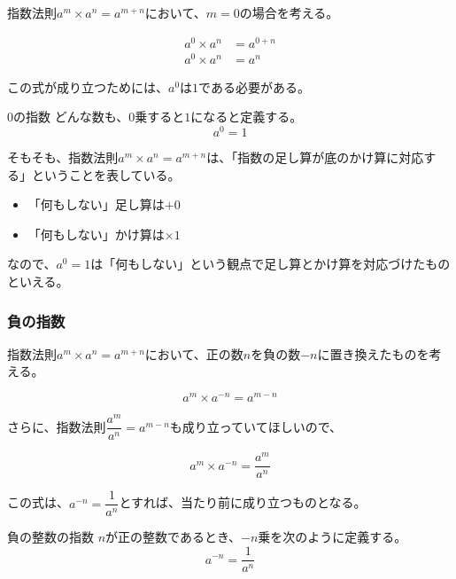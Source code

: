 \documentclass[16pt,b5paper]{book}
\begin{document}
指数法則$a^m \times a^n = a^{m+n}$において、$m=0$の場合を考える。

\begin{align}
  a^0 \times a^n & = a^{0+n} \\
  a^0 \times a^n & = a^n
\end{align}

この式が成り立つためには、$a^0$は$1$である必要がある。

\begin{definition}{$0$の指数}
  \newline
  どんな数も、$0$乗すると$1$になると定義する。
  \LARGE
  \begin{equation}
    a^0 = 1
  \end{equation}
\end{definition}

そもそも、指数法則$a^m \times a^n = a^{m+n}$は、「指数の足し算が底のかけ算に対応する」ということを表している。

\begin{itemize}
  \item 「何もしない」足し算は$+ 0$
  \item 「何もしない」かけ算は$\times 1$
\end{itemize}

なので、$a^0 = 1$は「何もしない」という観点で足し算とかけ算を対応づけたものといえる。

\subsubsection{負の指数}

指数法則$a^m \times a^n = a^{m+n}$において、正の数$n$を負の数$-n$に置き換えたものを考える。

\begin{equation}
  a^m \times a^{-n} = a^{m-n}
\end{equation}

さらに、指数法則$\dfrac{a^m}{a^n} = a^{m-n}$も成り立っていてほしいので、

\begin{equation}
  a^m \times a^{-n} = \dfrac{a^m}{a^n}
\end{equation}

この式は、$a^{-n}= \dfrac{1}{a^n}$とすれば、当たり前に成り立つものとなる。

\begin{definition}{負の整数の指数}
  \newline
  $n$が正の整数であるとき、$-n$乗を次のように定義する。
  \LARGE
  \begin{equation}
    a^{-n} = \dfrac{1}{a^n}
  \end{equation}
\end{definition}
\end{document}
